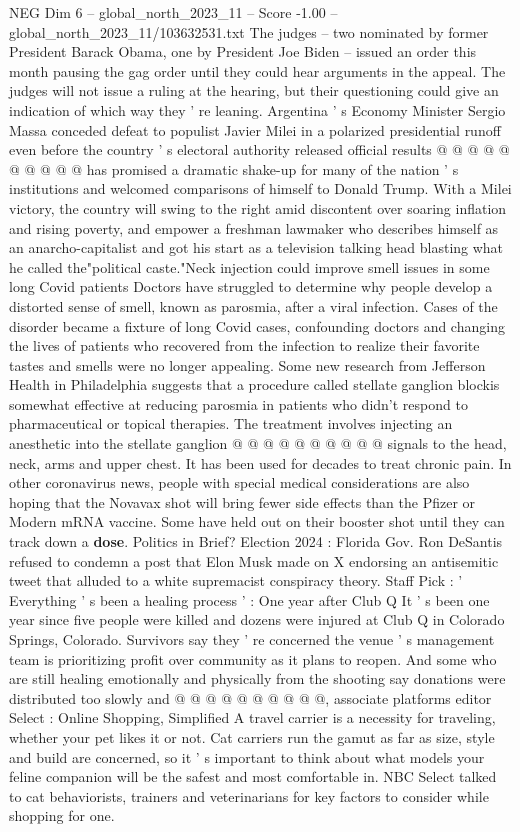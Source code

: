 \begin{textsample}{NEG Dim 6 – global\_north\_2023\_11 – Score -1.00 – global\_north\_2023\_11/103632531.txt}
The judges -- two nominated by former President Barack Obama, one by President Joe Biden -- issued an order this month pausing the gag order until they could hear arguments in the appeal.
The judges will not issue a ruling at the hearing, but their questioning could give an indication of which way they ' re leaning.
Argentina ' s Economy Minister Sergio Massa conceded defeat to populist Javier Milei in a polarized presidential runoff even before the country ' s electoral authority released official results @ @ @ @ @ @ @ @ @ @ has promised a dramatic shake-up for many of the nation ' s institutions and welcomed comparisons of himself to Donald Trump.
With a Milei victory, the country will swing to the right amid discontent over soaring inflation and rising poverty, and empower a freshman lawmaker who describes himself as an anarcho-capitalist and got his start as a television talking head blasting what he called the"political caste."Neck injection could improve smell issues in some long Covid patients Doctors have struggled to determine why people develop a distorted sense of smell, known as parosmia, after a viral infection.
Cases of the disorder became a fixture of long Covid cases, confounding doctors and changing the lives of patients who recovered from the infection to realize their favorite tastes and smells were no longer appealing.
Some new research from Jefferson Health in Philadelphia suggests that a procedure called stellate ganglion blockis somewhat effective at reducing parosmia in patients who didn't respond to pharmaceutical or topical therapies.
The treatment involves injecting an anesthetic into the stellate ganglion @ @ @ @ @ @ @ @ @ @ signals to the head, neck, arms and upper chest.
It has been used for decades to treat chronic pain.
In other coronavirus news, people with special medical considerations are also hoping that the Novavax shot will bring fewer side effects than the Pfizer or Modern mRNA vaccine.
Some have held out on their booster shot until they can track down a \textbf{dose}.
Politics in Brief?
Election 2024 : Florida Gov.
Ron DeSantis refused to condemn a post that Elon Musk made on X endorsing an antisemitic tweet that alluded to a white supremacist conspiracy theory.
Staff Pick : ' Everything ' s been a healing process ' : One year after Club Q It ' s been one year since five people were killed and dozens were injured at Club Q in Colorado Springs, Colorado.
Survivors say they ' re concerned the venue ' s management team is prioritizing profit over community as it plans to reopen.
And some who are still healing emotionally and physically from the shooting say donations were distributed too slowly and @ @ @ @ @ @ @ @ @ @, associate platforms editor Select : Online Shopping, Simplified A travel carrier is a necessity for traveling, whether your pet likes it or not.
Cat carriers run the gamut as far as size, style and build are concerned, so it ' s important to think about what models your feline companion will be the safest and most comfortable in.
NBC Select talked to cat behaviorists, trainers and veterinarians for key factors to consider while shopping for one.

\end{textsample}
